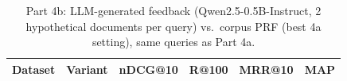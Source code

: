 \begin{table}[ht]\centering\small
\begin{tabular}{llrrrr}\toprule
Dataset & Variant & nDCG@10 & R@100 & MRR@10 & MAP \\ \midrule

\bottomrule\end{tabular}
\caption{Part 4b: LLM-generated feedback (Qwen2.5-0.5B-Instruct, 2 hypothetical documents per query) vs.\ corpus PRF (best 4a setting), same queries as Part 4a.}\label{tab:p4b}\end{table}
